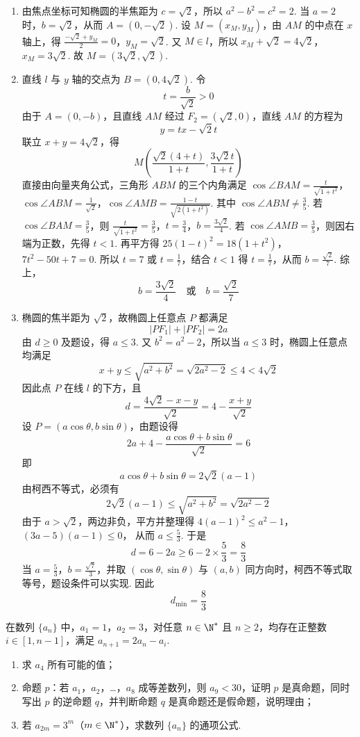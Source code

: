 \begin{solution}
\begin{enumerate}
\item 由焦点坐标可知椭圆的半焦距为 \(c=\sqrt2\)，所以 \(a^2-b^2=c^2=2\). 当 \(a=2\) 时，\(b=\sqrt2\)，从而 \(A=(0,-\sqrt2)\). 设 \(M=(x_M,y_M)\)，由 \(AM\) 的中点在 \(x\) 轴上，得
\(\frac{-\sqrt2+y_M}{2}=0\)，\(y_M=\sqrt2\).
又 \(M\in l\)，所以
\(x_M+\sqrt2=4\sqrt2\)，\(x_M=3\sqrt2\).
故 \(M=(3\sqrt2,\sqrt2)\).

\item 直线 \(l\) 与 \(y\) 轴的交点为 \(B=(0,4\sqrt2)\). 令
\[
t=\frac{b}{\sqrt2}>0
\]
由于 \(A=(0,-b)\)，且直线 \(AM\) 经过 \(F_2=(\sqrt2,0)\)，直线 \(AM\) 的方程为
\[
y=tx-\sqrt2t
\]
联立 \(x+y=4\sqrt2\)，得
\[
M\left(\frac{\sqrt2(4+t)}{1+t},\frac{3\sqrt2t}{1+t}\right)
\]
直接由向量夹角公式，三角形 \(ABM\) 的三个内角满足
\(\cos\angle BAM=\frac{t}{\sqrt{1+t^2}}\)，\(\cos\angle ABM=\frac1{\sqrt2}\)，\(\cos\angle AMB=\frac{1-t}{\sqrt{2(1+t^2)}}\).
其中 \(\cos\angle ABM\ne\frac35\). 若 \(\cos\angle BAM=\frac35\)，则
\(\frac{t}{\sqrt{1+t^2}}=\frac35\)，\(t=\frac34\)，\(b=\frac{3\sqrt2}{4}\).
若 \(\cos\angle AMB=\frac35\)，则因右端为正数，先得 \(t<1\). 再平方得
\(25(1-t)^2=18(1+t^2)\)，\(7t^2-50t+7=0\).
所以 \(t=7\) 或 \(t=\frac17\)，结合 \(t<1\) 得 \(t=\frac17\)，从而 \(b=\frac{\sqrt2}{7}\). 综上，
\[
b=\frac{3\sqrt2}{4}\quad\text{或}\quad b=\frac{\sqrt2}{7}
\]

\item 椭圆的焦半距为 \(\sqrt2\)，故椭圆上任意点 \(P\) 都满足
\[
|PF_1|+|PF_2|=2a
\]
由 \(d\ge0\) 及题设，得 \(a\le3\). 又 \(b^2=a^2-2\)，所以当 \(a\le3\) 时，椭圆上任意点均满足
\[
x+y\le\sqrt{a^2+b^2}=\sqrt{2a^2-2}\le4<4\sqrt2
\]
因此点 \(P\) 在线 \(l\) 的下方，且
\[
d=\frac{4\sqrt2-x-y}{\sqrt2}=4-\frac{x+y}{\sqrt2}
\]
设 \(P=(a\cos\theta,b\sin\theta)\)，由题设得
\[
2a+4-\frac{a\cos\theta+b\sin\theta}{\sqrt2}=6
\]
即
\[
a\cos\theta+b\sin\theta=2\sqrt2(a-1)
\]
由柯西不等式，必须有
\[
2\sqrt2(a-1)\le\sqrt{a^2+b^2}=\sqrt{2a^2-2}
\]
由于 \(a>\sqrt2\)，两边非负，平方并整理得
\(4(a-1)^2\le a^2-1\)，\((3a-5)(a-1)\le0\)，
从而 \(a\le\frac53\). 于是
\[
d=6-2a\ge6-2\times\frac53=\frac83
\]
当 \(a=\frac53\)，\(b=\frac{\sqrt7}{3}\)，并取 \((\cos\theta,\sin\theta)\) 与 \((a,b)\) 同方向时，柯西不等式取等号，题设条件可以实现. 因此
\[
d_{\min}=\frac83
\]
\end{enumerate}
\end{solution}

\begin{problem}
在数列 \(\{a_n\}\) 中，\(a_1=1\)，\(a_2=3\)，对任意 \(n\in\N^*\) 且 \(n\ge2\)，均存在正整数 \(i\in[1,n-1]\)，满足 \(a_{n+1}=2a_n-a_i\).
\begin{enumerate}
\item 求 \(a_4\) 所有可能的值；
\item 命题 \(p\)：若 \(a_1\)，\(a_2\)，\ldots，\(a_8\) 成等差数列，则 \(a_9<30\)，证明 \(p\) 是真命题，同时写出 \(p\) 的逆命题 \(q\)，并判断命题 \(q\) 是真命题还是假命题，说明理由；
\item 若 \(a_{2m}=3^m\)（\(m\in\N^*\)），求数列 \(\{a_n\}\) 的通项公式.
\end{enumerate}
\end{problem}

